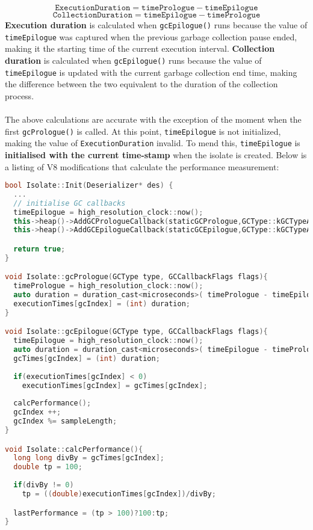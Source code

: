 \documentclass{l4proj}
\begin{document}
\begin{equation}
\texttt{ExecutionDuration} = \texttt{timePrologue} - \texttt{timeEpilogue}
\end{equation}
\begin{equation}
\texttt{CollectionDuration} = \texttt{timeEpilogue} - \texttt{timePrologue}
\end{equation}
\textbf{Execution duration} is calculated when \texttt{gcEpilogue()} runs because the value of \texttt{timeEpilogue} was captured when the previous garbage collection pause ended, making it the starting time of the current execution interval. \textbf{Collection duration} is calculated when \texttt{gcEpilogue()} runs because the value of \texttt{timeEpilogue} is updated with the current garbage collection end time, making the difference between the two equivalent to the duration of the collection process. 
\\\\
\hspace*{1em} The above calculations are accurate with the exception of the moment when the first \texttt{gcPrologue()} is called. At this point, \texttt{timeEpilogue} is not initialized, making the value of \texttt{ExecutionDuration} invalid. To mend this, \texttt{timeEpilogue} is \textbf{initialised with the current time-stamp} when the isolate is created. Below is a listing of V8 modifications that calculate the performance measurement:
\begin{lstlisting}[language=cpp]
bool Isolate::Init(Deserializer* des) {
  ...
  // initialise GC callbacks
  timeEpilogue = high_resolution_clock::now();
  this->heap()->AddGCPrologueCallback(staticGCPrologue,GCType::kGCTypeAll,true);
  this->heap()->AddGCEpilogueCallback(staticGCEpilogue,GCType::kGCTypeAll,true);

  return true;
}

void Isolate::gcPrologue(GCType type, GCCallbackFlags flags){
  timePrologue = high_resolution_clock::now();
  auto duration = duration_cast<microseconds>( timePrologue - timeEpilogue ).count();
  executionTimes[gcIndex] = (int) duration;
}

void Isolate::gcEpilogue(GCType type, GCCallbackFlags flags){
  timeEpilogue = high_resolution_clock::now();
  auto duration = duration_cast<microseconds>( timeEpilogue - timePrologue ).count();
  gcTimes[gcIndex] = (int) duration;
  
  if(executionTimes[gcIndex] < 0)
    executionTimes[gcIndex] = gcTimes[gcIndex];
  
  calcPerformance();  
  gcIndex ++;
  gcIndex %= sampleLength;
}

void Isolate::calcPerformance(){
  long long divBy = gcTimes[gcIndex];
  double tp = 100;
  
  if(divBy != 0)
    tp = ((double)executionTimes[gcIndex])/divBy;

  lastPerformance = (tp > 100)?100:tp;
}
\end{lstlisting}
\end{document}
